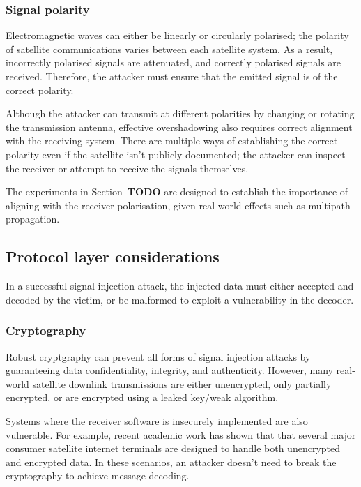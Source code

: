 
\subsubsection{Signal polarity}

Electromagnetic waves can either be linearly or circularly polarised; the polarity of satellite communications varies between each satellite system.
As a result, incorrectly polarised signals are attenuated, and correctly polarised signals are received.
Therefore, the attacker must ensure that the emitted signal is of the correct polarity.

Although the attacker can transmit at different polarities by changing or rotating the transmission antenna, effective overshadowing also requires correct alignment with the receiving system.
There are multiple ways of establishing the correct polarity even if the satellite isn't publicly documented; the attacker can inspect the receiver or attempt to receive the signals themselves.

The experiments in Section~\textbf{TODO} are designed to establish the importance of aligning with the receiver polarisation, given real world effects such as multipath propagation.

\subsection{Protocol layer considerations}


In a successful signal injection attack, the injected data must either accepted and decoded by the victim, or be malformed to exploit a vulnerability in the decoder.

\subsubsection{Cryptography}

Robust cryptgraphy can prevent all forms of signal injection attacks by guaranteeing data confidentiality, integrity, and authenticity.
However, many real-world satellite downlink transmissions are either unencrypted, only partially encrypted, or are encrypted using a leaked key/weak algorithm.

Systems where the receiver software is insecurely implemented are also vulnerable.
For example, recent academic work has shown that that several major consumer satellite internet terminals are designed to handle both unencrypted and encrypted data.
In these scenarios, an attacker doesn't need to break the cryptography to achieve message decoding.


